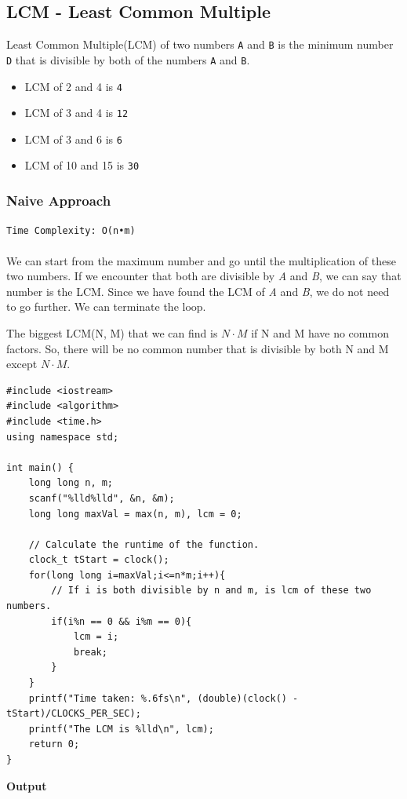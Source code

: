 \documentclass[12pt]{article}
\begin{document}
\clearpage

\subsection{LCM - Least Common Multiple}
Least Common Multiple(LCM) of two numbers \texttt{A} and \texttt{B} is the minimum number \texttt{D} that is divisible by both of the numbers \texttt{A} and \texttt{B}. 

\begin{itemize}
  \item LCM of 2 and 4 is \texttt{4} 
  \item LCM of 3 and 4 is \texttt{12} 
  \item LCM of 3 and 6 is \texttt{6} 
  \item LCM of 10 and 15 is \texttt{30} 
\end{itemize}

\subsubsection{Naive Approach }
\texttt{Time Complexity:  O(n•m) } \\ \\
We can start from the maximum number and go until the multiplication of these two numbers. If we encounter that both are divisible by \textit{A} and \textit{B}, we can say that number is the LCM. Since we have found the LCM of \textit{A} and \textit{B}, we do not need to go further. We can terminate the loop.

The biggest LCM(N, M) that we can find is $N \cdot M$ if  N and M have no common factors. So, there will be no common number that is divisible by both N and M except $N \cdot M$.

\begin{verbatim}
#include <iostream>
#include <algorithm>
#include <time.h>
using namespace std;

int main() {
    long long n, m;
    scanf("%lld%lld", &n, &m);
    long long maxVal = max(n, m), lcm = 0;

    // Calculate the runtime of the function.
    clock_t tStart = clock();
    for(long long i=maxVal;i<=n*m;i++){
        // If i is both divisible by n and m, is lcm of these two numbers.
        if(i%n == 0 && i%m == 0){
            lcm = i;
            break;
        }
    }
    printf("Time taken: %.6fs\n", (double)(clock() - tStart)/CLOCKS_PER_SEC);
    printf("The LCM is %lld\n", lcm);
    return 0;
}
\end{verbatim}
\textbf{Output}
\end{document}
